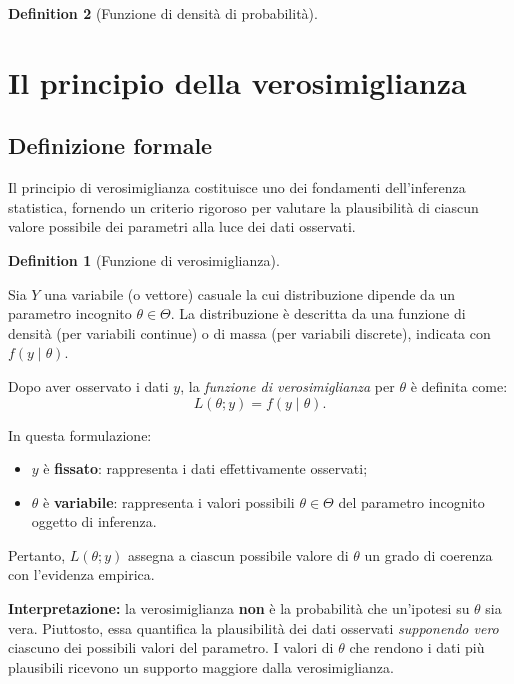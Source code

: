 \documentclass[
  letterpaper,
  DIV=11,
  numbers=noendperiod,
  oneside]{scrreprt}
\providecommand{\tightlist}{%
  \setlength{\itemsep}{0pt}\setlength{\parskip}{0pt}}
\theoremstyle{definition}
\theoremstyle{plain}
\theoremstyle{definition}
\newtheorem{definition}{Definition}[chapter]
\theoremstyle{remark}
\begin{document}
\begin{definition}[Funzione di densità di
probabilità]
\begin{tcolorbox}
\end{tcolorbox}

\section{Il principio della
verosimiglianza}\label{il-principio-della-verosimiglianza}

\subsection{Definizione formale}\label{definizione-formale-1}

Il principio di verosimiglianza costituisce uno dei fondamenti
dell'inferenza statistica, fornendo un criterio rigoroso per valutare la
plausibilità di ciascun valore possibile dei parametri alla luce dei
dati osservati.

\begin{definition}[Funzione di
verosimiglianza]\protect\hypertarget{def-likelihood}{}\label{def-likelihood}

Sia \(Y\) una variabile (o vettore) casuale la cui distribuzione dipende
da un parametro incognito \(\theta \in \Theta\). La distribuzione è
descritta da una funzione di densità (per variabili continue) o di massa
(per variabili discrete), indicata con \(f(y \mid \theta)\).

Dopo aver osservato i dati \(y\), la \emph{funzione di verosimiglianza}
per \(\theta\) è definita come: \[
L(\theta; y) = f(y \mid \theta).
\]

In questa formulazione:

\begin{itemize}
\tightlist
\item
  \(y\) è \textbf{fissato}: rappresenta i dati effettivamente osservati;
\item
  \(\theta\) è \textbf{variabile}: rappresenta i valori possibili
  \(\theta \in \Theta\) del parametro incognito oggetto di inferenza.
\end{itemize}

Pertanto, \(L(\theta; y)\) assegna a ciascun possibile valore di
\(\theta\) un grado di coerenza con l'evidenza empirica.

\end{definition}

\textbf{Interpretazione:} la verosimiglianza \textbf{non} è la
probabilità che un'ipotesi su \(\theta\) sia vera. Piuttosto, essa
quantifica la plausibilità dei dati osservati \emph{supponendo vero}
ciascuno dei possibili valori del parametro. I valori di \(\theta\) che
rendono i dati più plausibili ricevono un supporto maggiore dalla
verosimiglianza.


\end{definition}
\end{document}
